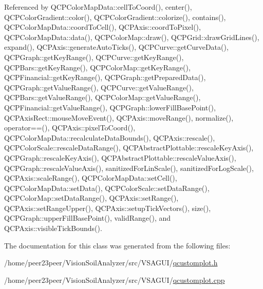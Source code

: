 Referenced by Q\+C\+P\+Color\+Map\+Data\+::cell\+To\+Coord(), center(), Q\+C\+P\+Color\+Gradient\+::color(), Q\+C\+P\+Color\+Gradient\+::colorize(), contains(), Q\+C\+P\+Color\+Map\+Data\+::coord\+To\+Cell(), Q\+C\+P\+Axis\+::coord\+To\+Pixel(), Q\+C\+P\+Color\+Map\+Data\+::data(), Q\+C\+P\+Color\+Map\+::draw(), Q\+C\+P\+Grid\+::draw\+Grid\+Lines(), expand(), Q\+C\+P\+Axis\+::generate\+Auto\+Ticks(), Q\+C\+P\+Curve\+::get\+Curve\+Data(), Q\+C\+P\+Graph\+::get\+Key\+Range(), Q\+C\+P\+Curve\+::get\+Key\+Range(), Q\+C\+P\+Bars\+::get\+Key\+Range(), Q\+C\+P\+Color\+Map\+::get\+Key\+Range(), Q\+C\+P\+Financial\+::get\+Key\+Range(), Q\+C\+P\+Graph\+::get\+Prepared\+Data(), Q\+C\+P\+Graph\+::get\+Value\+Range(), Q\+C\+P\+Curve\+::get\+Value\+Range(), Q\+C\+P\+Bars\+::get\+Value\+Range(), Q\+C\+P\+Color\+Map\+::get\+Value\+Range(), Q\+C\+P\+Financial\+::get\+Value\+Range(), Q\+C\+P\+Graph\+::lower\+Fill\+Base\+Point(), Q\+C\+P\+Axis\+Rect\+::mouse\+Move\+Event(), Q\+C\+P\+Axis\+::move\+Range(), normalize(), operator==(), Q\+C\+P\+Axis\+::pixel\+To\+Coord(), Q\+C\+P\+Color\+Map\+Data\+::recalculate\+Data\+Bounds(), Q\+C\+P\+Axis\+::rescale(), Q\+C\+P\+Color\+Scale\+::rescale\+Data\+Range(), Q\+C\+P\+Abstract\+Plottable\+::rescale\+Key\+Axis(), Q\+C\+P\+Graph\+::rescale\+Key\+Axis(), Q\+C\+P\+Abstract\+Plottable\+::rescale\+Value\+Axis(), Q\+C\+P\+Graph\+::rescale\+Value\+Axis(), sanitized\+For\+Lin\+Scale(), sanitized\+For\+Log\+Scale(), Q\+C\+P\+Axis\+::scale\+Range(), Q\+C\+P\+Color\+Map\+Data\+::set\+Cell(), Q\+C\+P\+Color\+Map\+Data\+::set\+Data(), Q\+C\+P\+Color\+Scale\+::set\+Data\+Range(), Q\+C\+P\+Color\+Map\+::set\+Data\+Range(), Q\+C\+P\+Axis\+::set\+Range(), Q\+C\+P\+Axis\+::set\+Range\+Upper(), Q\+C\+P\+Axis\+::setup\+Tick\+Vectors(), size(), Q\+C\+P\+Graph\+::upper\+Fill\+Base\+Point(), valid\+Range(), and Q\+C\+P\+Axis\+::visible\+Tick\+Bounds().



The documentation for this class was generated from the following files\+:\begin{DoxyCompactItemize}
\item 
/home/peer23peer/\+Vision\+Soil\+Analyzer/src/\+V\+S\+A\+G\+U\+I/\hyperlink{qcustomplot_8h}{qcustomplot.\+h}\item 
/home/peer23peer/\+Vision\+Soil\+Analyzer/src/\+V\+S\+A\+G\+U\+I/\hyperlink{qcustomplot_8cpp}{qcustomplot.\+cpp}\end{DoxyCompactItemize}
